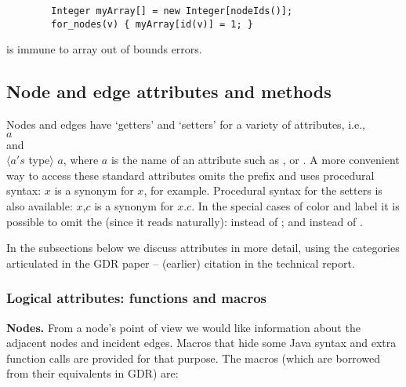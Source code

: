 \begin{minipage}{0.8\textwidth}
\begin{verbatim}
        Integer myArray[] = new Integer[nodeIds()];
        for_nodes(v) { myArray[id(v)] = 1; }
\end{verbatim}
\end{minipage}

is immune to array out of bounds errors.

\subsection{Node and edge attributes and methods} \label{sec:nodes_and_edges}

Nodes and edges have `getters' and `setters' for
a variety of attributes, i.e.,
\\
$a$
\\
and
\\
$\langle a's$ type$\rangle$ $a$\Code{()},
where $a$ is the name of an attribute such as
,
 or .
A more convenient way to access these standard attributes omits the prefix 
and uses procedural syntax:
$x$\Code{)} is a synonym for $x$, for example.
Procedural syntax for the setters is also available:
$x$,$c$\Code{)} is a synonym for $x$.$c$\Code{)}.
In the special cases of color and label it is possible to omit the 
(since it reads naturally):
 instead of
;
and
 instead of
.

In the subsections below we discuss attributes in more detail, using the
categories articulated in the GDR paper -- (earlier) citation in the technical
report.

\subsubsection{Logical attributes: functions and macros}

\textbf{Nodes.} From a node's point of view we would like information about
the adjacent nodes and incident edges.
Macros that hide some Java syntax and extra function calls are provided for
that purpose.
The macros (which are borrowed from their equivalents in GDR) are:

